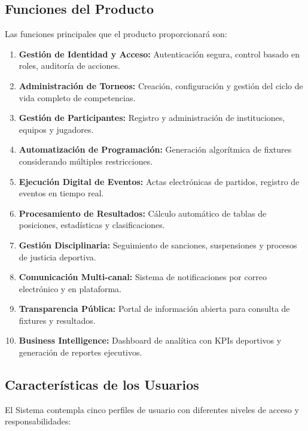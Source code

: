 \documentclass[12pt,a4paper]{article}
\begin{document}
\subsection{Funciones del Producto}

Las funciones principales que el producto proporcionará son:

\begin{enumerate}[noitemsep]
    \item \textbf{Gestión de Identidad y Acceso:} Autenticación segura, control basado en roles, auditoría de acciones.
    \item \textbf{Administración de Torneos:} Creación, configuración y gestión del ciclo de vida completo de competencias.
    \item \textbf{Gestión de Participantes:} Registro y administración de instituciones, equipos y jugadores.
    \item \textbf{Automatización de Programación:} Generación algorítmica de fixtures considerando múltiples restricciones.
    \item \textbf{Ejecución Digital de Eventos:} Actas electrónicas de partidos, registro de eventos en tiempo real.
    \item \textbf{Procesamiento de Resultados:} Cálculo automático de tablas de posiciones, estadísticas y clasificaciones.
    \item \textbf{Gestión Disciplinaria:} Seguimiento de sanciones, suspensiones y procesos de justicia deportiva.
    \item \textbf{Comunicación Multi-canal:} Sistema de notificaciones por correo electrónico y en plataforma.
    \item \textbf{Transparencia Pública:} Portal de información abierta para consulta de fixtures y resultados.
    \item \textbf{Business Intelligence:} Dashboard de analítica con KPIs deportivos y generación de reportes ejecutivos.
\end{enumerate}

\subsection{Características de los Usuarios}

El Sistema contempla cinco perfiles de usuario con diferentes niveles de acceso y responsabilidades:
\end{document}
